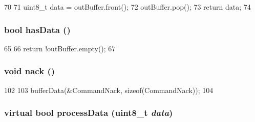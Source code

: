 \begin{DoxyCode}
70     {
71         uint8_t data = outBuffer.front();
72         outBuffer.pop();
73         return data;
74     }
\end{DoxyCode}
\hypertarget{classX86ISA_1_1PS2Device_a409e05a5f45af16b718f74360a118941}{
\subsubsection[{hasData}]{\setlength{\rightskip}{0pt plus 5cm}bool hasData ()}}
\label{classX86ISA_1_1PS2Device_a409e05a5f45af16b718f74360a118941}



\begin{DoxyCode}
65     {
66         return !outBuffer.empty();
67     }
\end{DoxyCode}
\hypertarget{classX86ISA_1_1PS2Device_add2392e874a62256159bff48d370fe4d}{
\subsubsection[{nack}]{\setlength{\rightskip}{0pt plus 5cm}void nack ()}}
\label{classX86ISA_1_1PS2Device_add2392e874a62256159bff48d370fe4d}



\begin{DoxyCode}
102 {
103     bufferData(&CommandNack, sizeof(CommandNack));
104 }
\end{DoxyCode}
\hypertarget{classX86ISA_1_1PS2Device_a7bfab1b5725d41896d0cd06793244ab7}{
\subsubsection[{processData}]{\setlength{\rightskip}{0pt plus 5cm}virtual bool processData (uint8\_\-t {\em data})}}
\label{classX86ISA_1_1PS2Device_a7bfab1b5725d41896d0cd06793244ab7}


